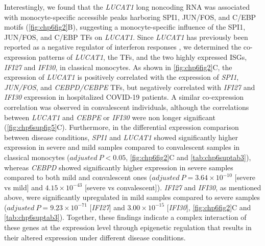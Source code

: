 \documentclass{book}
\begin{document}
\begin{refsection}
Interestingly, we found that the \textit{LUCAT1} long noncoding RNA was associated with monocyte-specific accessible peaks harboring SPI1, JUN/FOS, and C/EBP motifs (\ref{fig:chp6fig2}B), suggesting a monocyte-specific influence of the SPI1, JUN/FOS, and C/EBP TFs on \textit{LUCAT1}.
Since \textit{LUCAT1} has previously been reported as a negative regulator of interferon responses \cite{Agarwal2020A}, we determined the co-expression patterns of \textit{LUCAT1}, the TFs, and the two highly expressed ISGs, \textit{IFI27} and \textit{IFI30}, in classical monocytes.
As shown in \ref{fig:chp6fig2}C, the expression of \textit{LUCAT1} is positively correlated with the expression of \textit{SPI1}, \textit{JUN/FOS}, and \textit{CEBPD/CEBPE} TFs, but negatively correlated with \textit{IFI27} and \textit{IFI30} expression in hospitalized COVID-19 patients.
A similar co-expression correlation was observed in convalescent individuals, although the correlations between \textit{LUCAT1} and \textit{CEBPE} or \textit{IFI30} were non longer significant (\ref{fig:chp6supfig5}C).
Furthermore, in the differential expression comparison between disease conditions, \textit{SPI1} and \textit{LUCAT1} showed significantly higher expression in severe and mild samples compared to convalescent samples in classical monocytes ($adjusted~P < 0.05$, \ref{fig:chp6fig2}C and \ref{tab:chp6suptab3}), whereas \textit{CEBPD} showed significantly higher expression in severe samples compared to both mild and convalescent ones ($adjusted~P = 3.64 \times 10^{-10}$ [severe vs mild] and $4.15 \times 10^{-43}$ [severe vs convalescent]).
\textit{IFI27} and \textit{IFI30}, as mentioned above, were significantly upregulated in mild samples compared to severe samples ($adjusted~P = 9.23 \times 10^{-71}$ [\textit{IFI27}] and $3.00 \times 10^{-15}$ [\textit{IFI30}], \ref{fig:chp6fig2}C and \ref{tab:chp6suptab3}).
Together, these findings indicate a complex interaction of these genes at the expression level through epigenetic regulation that results in their altered expression under different disease conditions.


\end{refsection}
\end{document}
